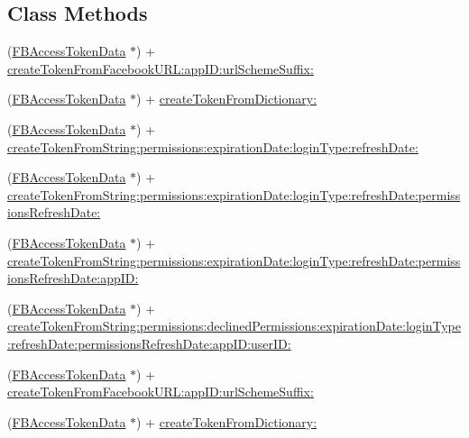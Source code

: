 \subsection*{Class Methods}
\begin{DoxyCompactItemize}
\item 
(\hyperlink{interfaceFBAccessTokenData}{F\+B\+Access\+Token\+Data} $\ast$) + \hyperlink{interfaceFBAccessTokenData_a3c27c994504eb470de2aa02ce71ab3d5}{create\+Token\+From\+Facebook\+U\+R\+L\+:app\+I\+D\+:url\+Scheme\+Suffix\+:}
\item 
(\hyperlink{interfaceFBAccessTokenData}{F\+B\+Access\+Token\+Data} $\ast$) + \hyperlink{interfaceFBAccessTokenData_a0a756bdb60ce1b81cd4dbc61943315a9}{create\+Token\+From\+Dictionary\+:}
\item 
(\hyperlink{interfaceFBAccessTokenData}{F\+B\+Access\+Token\+Data} $\ast$) + \hyperlink{interfaceFBAccessTokenData_af4dd1baa0412b64f5234595a50db223d}{create\+Token\+From\+String\+:permissions\+:expiration\+Date\+:login\+Type\+:refresh\+Date\+:}
\item 
(\hyperlink{interfaceFBAccessTokenData}{F\+B\+Access\+Token\+Data} $\ast$) + \hyperlink{interfaceFBAccessTokenData_ae197e866e84fdbfde1d66b936f0dcc90}{create\+Token\+From\+String\+:permissions\+:expiration\+Date\+:login\+Type\+:refresh\+Date\+:permissions\+Refresh\+Date\+:}
\item 
(\hyperlink{interfaceFBAccessTokenData}{F\+B\+Access\+Token\+Data} $\ast$) + \hyperlink{interfaceFBAccessTokenData_af4e6f1dc14436e143c86c4490c79f4c8}{create\+Token\+From\+String\+:permissions\+:expiration\+Date\+:login\+Type\+:refresh\+Date\+:permissions\+Refresh\+Date\+:app\+I\+D\+:}
\item 
(\hyperlink{interfaceFBAccessTokenData}{F\+B\+Access\+Token\+Data} $\ast$) + \hyperlink{interfaceFBAccessTokenData_a9acd1b715ed1dc4b9c8d7b339eca2ab2}{create\+Token\+From\+String\+:permissions\+:declined\+Permissions\+:expiration\+Date\+:login\+Type\+:refresh\+Date\+:permissions\+Refresh\+Date\+:app\+I\+D\+:user\+I\+D\+:}
\item 
(\hyperlink{interfaceFBAccessTokenData}{F\+B\+Access\+Token\+Data} $\ast$) + \hyperlink{interfaceFBAccessTokenData_a3c27c994504eb470de2aa02ce71ab3d5}{create\+Token\+From\+Facebook\+U\+R\+L\+:app\+I\+D\+:url\+Scheme\+Suffix\+:}
\item 
(\hyperlink{interfaceFBAccessTokenData}{F\+B\+Access\+Token\+Data} $\ast$) + \hyperlink{interfaceFBAccessTokenData_a0a756bdb60ce1b81cd4dbc61943315a9}{create\+Token\+From\+Dictionary\+:}
\item 

\end{DoxyCompactItemize}
